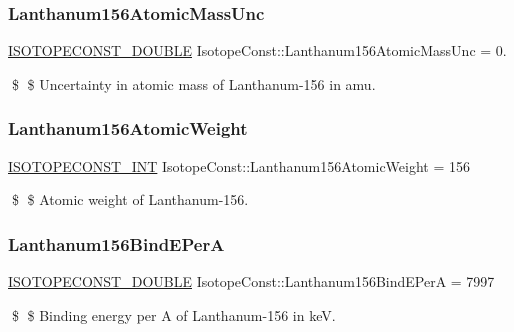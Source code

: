 \subsubsection{\texorpdfstring{Lanthanum156\+Atomic\+Mass\+Unc}{Lanthanum156AtomicMassUnc}}
{\footnotesize\ttfamily \mbox{\hyperlink{group___isotope_const-_macros_ga8f45a7272ce02c0b4c65c44636ed719a}{I\+S\+O\+T\+O\+P\+E\+C\+O\+N\+S\+T\+\_\+\+D\+O\+U\+B\+LE}} Isotope\+Const\+::\+Lanthanum156\+Atomic\+Mass\+Unc = 0.}

\$ \$ Uncertainty in atomic mass of Lanthanum-\/156 in amu. \mbox{\label{group___isotope_const-_lanthanum-_la156_gaf8fa9b7781374ff9e8e421fa62c7e9ab}} 
\subsubsection{\texorpdfstring{Lanthanum156\+Atomic\+Weight}{Lanthanum156AtomicWeight}}
{\footnotesize\ttfamily \mbox{\hyperlink{group___isotope_const-_macros_ga5f18360b3e99483a35c32d789e62621c}{I\+S\+O\+T\+O\+P\+E\+C\+O\+N\+S\+T\+\_\+\+I\+NT}} Isotope\+Const\+::\+Lanthanum156\+Atomic\+Weight = 156}

\$ \$ Atomic weight of Lanthanum-\/156. \mbox{\label{group___isotope_const-_lanthanum-_la156_gaeb0532d06309a4d888476865e0f42041}} 
\subsubsection{\texorpdfstring{Lanthanum156\+Bind\+E\+PerA}{Lanthanum156BindEPerA}}
{\footnotesize\ttfamily \mbox{\hyperlink{group___isotope_const-_macros_ga8f45a7272ce02c0b4c65c44636ed719a}{I\+S\+O\+T\+O\+P\+E\+C\+O\+N\+S\+T\+\_\+\+D\+O\+U\+B\+LE}} Isotope\+Const\+::\+Lanthanum156\+Bind\+E\+PerA = 7997}

\$ \$ Binding energy per A of Lanthanum-\/156 in keV. \mbox{\label{group___isotope_const-_lanthanum-_la156_gabcbb835de8cbb5a5facad8577f1f43f3}} 
